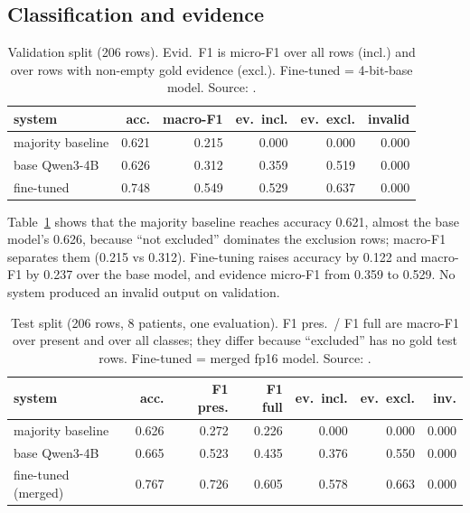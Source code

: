 \documentclass[conference]{IEEEtran}
\begin{document}
\subsection{Classification and evidence}
\begin{table}[t]
\caption{Validation split (206 rows). Evid.\ F1 is micro-F1 over all rows (incl.) and over rows with non-empty gold evidence (excl.). Fine-tuned = 4-bit-base model. Source: \protect{}.}\label{tab:val}
\centering\small\setlength{\tabcolsep}{3pt}
\begin{tabular}{lrrrrr}
\toprule
system & acc. & macro-F1 & ev.\ incl. & ev.\ excl. & invalid\\
\midrule
majority baseline & 0.621 & 0.215 & 0.000 & 0.000 & 0.000\\
base Qwen3-4B & 0.626 & 0.312 & 0.359 & 0.519 & 0.000\\
fine-tuned & 0.748 & 0.549 & 0.529 & 0.637 & 0.000\\
\bottomrule
\end{tabular}
\end{table}

Table~\ref{tab:val} shows that the majority baseline reaches accuracy 0.621, almost the base model's 0.626, because ``not excluded'' dominates the exclusion rows; macro-F1 separates them (0.215 vs 0.312). Fine-tuning raises accuracy by 0.122 and macro-F1 by 0.237 over the base model, and evidence micro-F1 from 0.359 to 0.529. No system produced an invalid output on validation.

\begin{table}[t]
\caption{Test split (206 rows, 8 patients, one evaluation). F1 pres.\ / F1 full are macro-F1 over present and over all classes; they differ because ``excluded'' has no gold test rows. Fine-tuned = merged fp16 model. Source: \protect{}.}\label{tab:test}
\centering\footnotesize\setlength{\tabcolsep}{2pt}
\begin{tabular}{lrrrrrr}
\toprule
system & acc. & F1 pres. & F1 full & ev.\ incl. & ev.\ excl. & inv.\\
\midrule
majority baseline & 0.626 & 0.272 & 0.226 & 0.000 & 0.000 & 0.000\\
base Qwen3-4B & 0.665 & 0.523 & 0.435 & 0.376 & 0.550 & 0.000\\
fine-tuned (merged) & 0.767 & 0.726 & 0.605 & 0.578 & 0.663 & 0.000\\
\bottomrule
\end{tabular}
\end{table}
\end{document}
